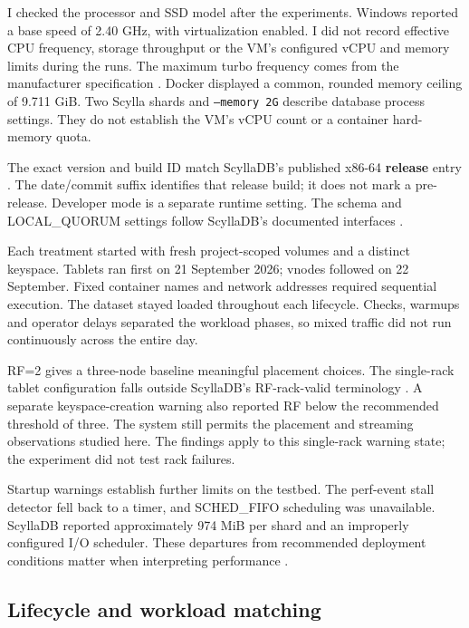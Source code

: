 I checked the processor and SSD model after the experiments. Windows reported a base speed of 2.40 GHz, with virtualization enabled. I did not record effective CPU frequency, storage throughput or the VM's configured vCPU and memory limits during the runs. The maximum turbo frequency comes from the manufacturer specification \cite{r34}. Docker displayed a common, rounded memory ceiling of 9.711 GiB. Two Scylla shards and \texttt{--memory 2G} describe database process settings. They do not establish the VM's vCPU count or a container hard-memory quota.

The exact version and build ID match ScyllaDB's published x86-64 \textbf{release} entry \cite{r33}. The date/commit suffix identifies that release build; it does not mark a pre-release. Developer mode is a separate runtime setting. The schema and LOCAL\_QUORUM settings follow ScyllaDB's documented interfaces \cite{r2,r3}.

Each treatment started with fresh project-scoped volumes and a distinct keyspace. Tablets ran first on 21 September 2026; vnodes followed on 22 September. Fixed container names and network addresses required sequential execution. The dataset stayed loaded throughout each lifecycle. Checks, warmups and operator delays separated the workload phases, so mixed traffic did not run continuously across the entire day.

RF=2 gives a three-node baseline meaningful placement choices. The single-rack tablet configuration falls outside ScyllaDB's RF-rack-valid terminology \cite{r10}. A separate keyspace-creation warning also reported RF below the recommended threshold of three. The system still permits the placement and streaming observations studied here. The findings apply to this single-rack warning state; the experiment did not test rack failures.

Startup warnings establish further limits on the testbed. The perf-event stall detector fell back to a timer, and SCHED\_FIFO scheduling was unavailable. ScyllaDB reported approximately 974 MiB per shard and an improperly configured I/O scheduler. These departures from recommended deployment conditions matter when interpreting performance \cite{r7}.

\newpage

\hypertarget{lifecycle-and-workload-matching}{%
\subsection{Lifecycle and workload
matching}\label{lifecycle-and-workload-matching}}

